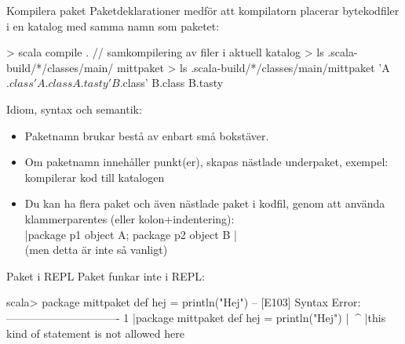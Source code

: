 \begin{Slide}{Kompilera paket}\SlideFontSmall
Paketdeklarationer medför att kompilatorn placerar bytekodfiler i en katalog med samma namn som paketet:
\begin{REPL}
> scala compile . // samkompilering av filer i aktuell katalog
> ls .scala-build/*/classes/main/
mittpaket
> ls .scala-build/*/classes/main/mittpaket
'A$.class'   A.class   A.tasty  'B$.class'   B.class   B.tasty 
\end{REPL}
\pause
Idiom, syntax och semantik:
\begin{itemize}
  \item Paketnamn brukar bestå av enbart små bokstäver.
  \item Om paketnamn innehåller punkt(er), skapas nästlade underpaket, exempel:   kompilerar kod till katalogen 
  \item Du kan ha flera paket och även nästlade paket i  kodfil, genom att använda klammerparentes (eller kolon+indentering):\\
  \code|package p1 { object A; package p2 { object B }}|\\
  (men detta är inte så vanligt)
\end{itemize}
\end{Slide}

\begin{Slide}{Paket i REPL}
Paket funkar inte i REPL:
\begin{REPLnonum}
scala> package mittpaket { def hej = println("Hej") }
-- [E103] Syntax Error: -------------------------------
1 |package mittpaket { def hej = println("Hej") }
  |^^^^^^^
  |this kind of statement is not allowed here

\end{REPLnonum}
\end{Slide}




